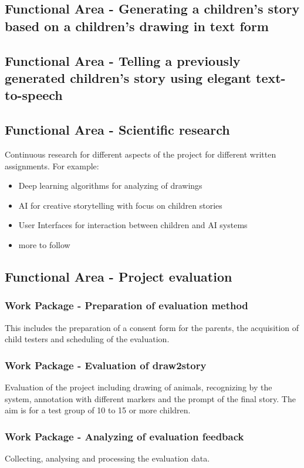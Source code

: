 \subsection{Functional Area - Generating a children's story based on a children's drawing in text form}

\subsection{Functional Area - Telling a previously generated children's story using elegant text-to-speech}

\subsection{Functional Area - Scientific research}
Continuous research for different aspects of the project for different written assignments.
For example:
\begin{itemize}
	\item Deep learning algorithms for analyzing of drawings
	\item AI for creative storytelling with focus on children stories
	\item User Interfaces for interaction between children and AI systems
	\item more to follow
\end{itemize}

\subsection{Functional Area - Project evaluation}

\subsubsection{Work Package - Preparation of evaluation method}
This includes the preparation of a consent form for the parents, the acquisition of child testers and scheduling of the evaluation.

\subsubsection{Work Package - Evaluation of draw2story}
Evaluation of the project including drawing of animals, recognizing by the system, annotation with different markers and the prompt of the final story.
The aim is for a test group of 10 to 15 or more children.

\subsubsection{Work Package - Analyzing of evaluation feedback}
Collecting, analysing and processing the evaluation data.
